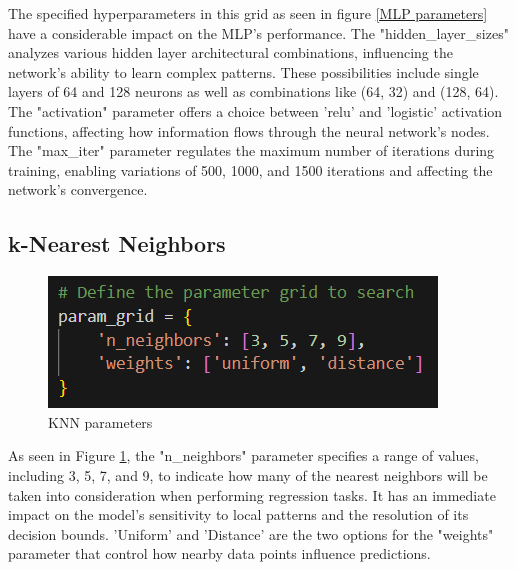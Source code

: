 \documentclass[a4paper,12pt]{report}%
\renewcommand{\\}{\vspace*{0.5\baselineskip} \newline}
\begin{document}
\noindent The specified hyperparameters in this grid as seen in figure \ref{MLP parameters} have a considerable impact on the MLP's performance. The "hidden\_layer\_sizes" analyzes various hidden layer architectural combinations, influencing the network's ability to learn complex patterns. These possibilities include single layers of 64 and 128 neurons as well as combinations like (64, 32) and (128, 64).
The "activation" parameter offers a choice between 'relu' and 'logistic' activation functions, affecting how information flows through the neural network's nodes.
The "max\_iter" parameter regulates the maximum number of iterations during training, enabling variations of 500, 1000, and 1500 iterations and affecting the network's convergence.

\subsection{k-Nearest Neighbors}

\begin{figure}[h]
\centering
	\includegraphics[scale=0.95]{images/knn param.png}\\
	\begin{footnotesize}
		\caption{KNN parameters}
		\label{KNN parameters}
	\end{footnotesize}
\end{figure}

\noindent As seen in Figure \ref{KNN parameters}, the "n\_neighbors" parameter specifies a range of values, including 3, 5, 7, and 9, to indicate how many of the nearest neighbors will be taken into consideration when performing regression tasks. It has an immediate impact on the model's sensitivity to local patterns and the resolution of its decision bounds. 'Uniform' and 'Distance' are the two options for the "weights" parameter that control how nearby data points influence predictions. 



\bigskip
\bigskip
\end{document}
